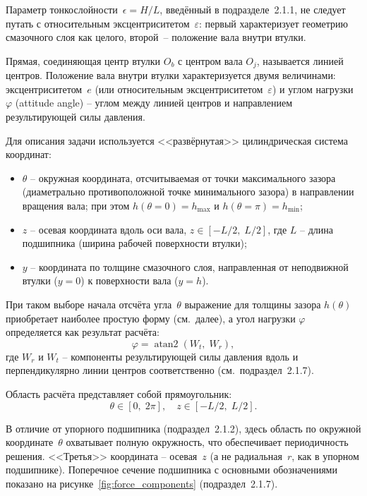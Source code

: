 Параметр тонкослойности~$\epsilon = H/L$, введённый в подразделе~2.1.1, не следует путать с относительным эксцентриситетом~$\varepsilon$: первый характеризует геометрию смазочного слоя как целого, второй~-- положение вала внутри втулки.

Прямая, соединяющая центр втулки $O_b$ с центром вала $O_j$, называется линией центров. Положение вала внутри втулки характеризуется двумя величинами: эксцентриситетом~$e$ (или относительным эксцентриситетом~$\varepsilon$) и углом нагрузки $\varphi$ (attitude angle) -- углом между линией центров и направлением результирующей силы давления.

Для описания задачи используется <<развёрнутая>> цилиндрическая система координат:
\begin{itemize}
\item $\theta$ -- окружная координата, отсчитываемая от точки максимального зазора (диаметрально противоположной точке минимального зазора) в направлении вращения вала; при этом $h(\theta = 0) = h_{\max}$ и $h(\theta = \pi) = h_{\min}$;
\item $z$ -- осевая координата вдоль оси вала, $z \in [-L/2,\; L/2]$, где $L$ -- длина подшипника (ширина рабочей поверхности втулки);
\item $y$ -- координата по толщине смазочного слоя, направленная от неподвижной втулки ($y = 0$) к поверхности вала ($y = h$).
\end{itemize}

При таком выборе начала отсчёта угла~$\theta$ выражение для толщины зазора $h(\theta)$ приобретает наиболее простую форму (см.\ далее), а угол нагрузки $\varphi$ определяется как результат расчёта:
\begin{equation}
\varphi = \operatorname{atan2}(W_t,\; W_r),
\label{eq:journal_attitude}
\end{equation}
где $W_r$ и $W_t$ -- компоненты результирующей силы давления вдоль и перпендикулярно линии центров соответственно (см.~подраздел~2.1.7).

Область расчёта представляет собой прямоугольник:
\begin{equation}
\theta \in [0,\; 2\pi], \quad z \in [-L/2,\; L/2].
\label{eq:journal_domain}
\end{equation}

В отличие от упорного подшипника (подраздел~2.1.2), здесь область по окружной координате~$\theta$ охватывает полную окружность, что обеспечивает периодичность решения. <<Третья>> координата -- осевая~$z$ (а не радиальная~$r$, как в упорном подшипнике). Поперечное сечение подшипника с основными обозначениями показано на рисунке~\ref{fig:force_components} (подраздел~2.1.7).

